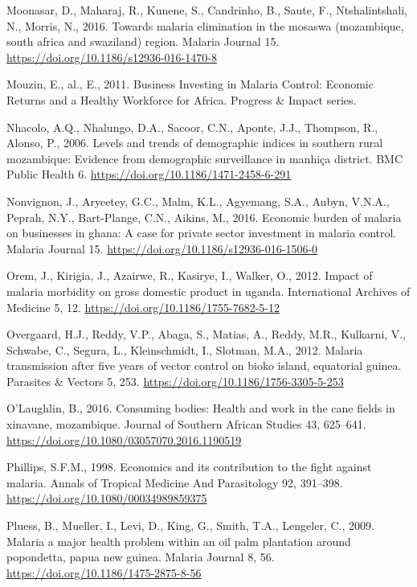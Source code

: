 \documentclass[]{article}
\begin{document}
\hypertarget{ref-Moonasar_2016}{}
Moonasar, D., Maharaj, R., Kunene, S., Candrinho, B., Saute, F.,
Ntshalintshali, N., Morris, N., 2016. Towards malaria elimination in the
mosaswa (mozambique, south africa and swaziland) region. Malaria Journal
15. \url{https://doi.org/10.1186/s12936-016-1470-8}

\hypertarget{ref-Mouzin2011}{}
Mouzin, E., al., E., 2011. Business Investing in Malaria Control:
Economic Returns and a Healthy Workforce for Africa. Progress \& Impact
series.

\hypertarget{ref-Nhacolo_2006}{}
Nhacolo, A.Q., Nhalungo, D.A., Sacoor, C.N., Aponte, J.J., Thompson, R.,
Alonso, P., 2006. Levels and trends of demographic indices in southern
rural mozambique: Evidence from demographic surveillance in manhiça
district. BMC Public Health 6.
\url{https://doi.org/10.1186/1471-2458-6-291}

\hypertarget{ref-Nonvignon_2016}{}
Nonvignon, J., Aryeetey, G.C., Malm, K.L., Agyemang, S.A., Aubyn,
V.N.A., Peprah, N.Y., Bart-Plange, C.N., Aikins, M., 2016. Economic
burden of malaria on businesses in ghana: A case for private sector
investment in malaria control. Malaria Journal 15.
\url{https://doi.org/10.1186/s12936-016-1506-0}

\hypertarget{ref-Orem_2012}{}
Orem, J., Kirigia, J., Azairwe, R., Kasirye, I., Walker, O., 2012.
Impact of malaria morbidity on gross domestic product in uganda.
International Archives of Medicine 5, 12.
\url{https://doi.org/10.1186/1755-7682-5-12}

\hypertarget{ref-Overgaard2012}{}
Overgaard, H.J., Reddy, V.P., Abaga, S., Matias, A., Reddy, M.R.,
Kulkarni, V., Schwabe, C., Segura, L., Kleinschmidt, I., Slotman, M.A.,
2012. Malaria transmission after five years of vector control on bioko
island, equatorial guinea. Parasites \& Vectors 5, 253.
\url{https://doi.org/10.1186/1756-3305-5-253}

\hypertarget{ref-OLaughlin2016}{}
O'Laughlin, B., 2016. Consuming bodies: Health and work in the cane
fields in xinavane, mozambique. Journal of Southern African Studies 43,
625--641. \url{https://doi.org/10.1080/03057070.2016.1190519}

\hypertarget{ref-Phillips98}{}
Phillips, S.F.M., 1998. Economics and its contribution to the fight
against malaria. Annals of Tropical Medicine And Parasitology 92,
391--398. \url{https://doi.org/10.1080/00034989859375}

\hypertarget{ref-Pluess2009}{}
Pluess, B., Mueller, I., Levi, D., King, G., Smith, T.A., Lengeler, C.,
2009. Malaria a major health problem within an oil palm plantation
around popondetta, papua new guinea. Malaria Journal 8, 56.
\url{https://doi.org/10.1186/1475-2875-8-56}
\end{document}
